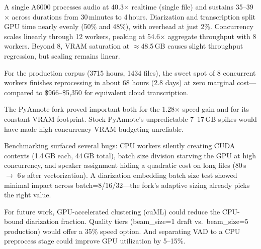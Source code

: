 \documentclass[conference,10pt]{IEEEtran}
\begin{document}
A single A6000 processes audio at 40.3$\times$ realtime (single file) and
sustains 35--39$\times$ across durations from 30\,minutes to 4\,hours.
Diarization and transcription split GPU time nearly evenly (50\% and 48\%),
with overhead at just 2\%. Concurrency scales linearly through 12 workers,
peaking at 54.6$\times$ aggregate throughput with 8 workers. Beyond 8, VRAM
saturation at $\approx$48.5\,GB causes slight throughput regression, but
scaling remains linear.

For the production corpus (\num{3715} hours, \num{1434} files), the sweet
spot of 8 concurrent workers finishes reprocessing in about 68 hours (2.8
days) at zero marginal cost---compared to \$966--\$5,350 for equivalent
cloud transcription.

The PyAnnote fork proved important both for the 1.28$\times$ speed gain and
for its constant VRAM footprint. Stock PyAnnote's unpredictable 7--17\,GB
spikes would have made high-concurrency VRAM budgeting unreliable.

Benchmarking surfaced several bugs: CPU workers silently creating CUDA
contexts (1.4\,GB each, 44\,GB total), batch size division starving the GPU
at high concurrency, and speaker assignment hiding a quadratic cost on long
files (80\,s $\to$ 6\,s after vectorization). A diarization embedding batch
size test showed minimal impact across batch=8/16/32---the fork's adaptive
sizing already picks the right value.

For future work, GPU-accelerated clustering (cuML) could reduce the
CPU-bound diarization fraction. Quality tiers (beam\_size=1 draft vs.\
beam\_size=5 production) would offer a 35\% speed option. And separating VAD
to a CPU preprocess stage could improve GPU utilization by 5--15\%.
\end{document}
